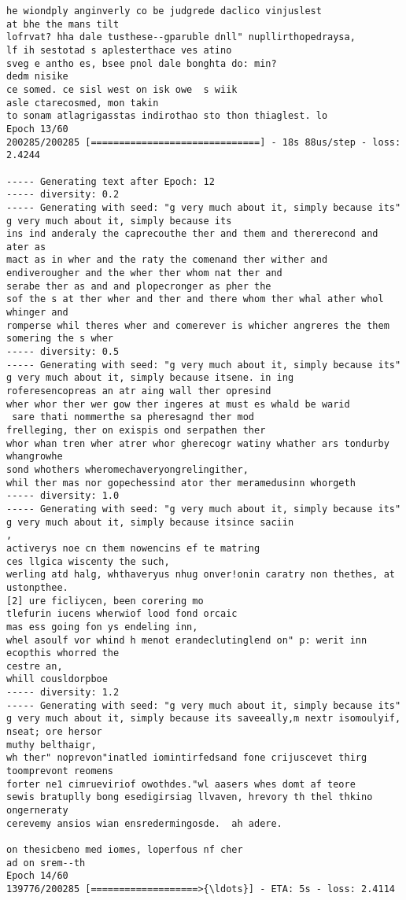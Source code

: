 \documentclass[11pt]{article}
\begin{document}
\begin{Verbatim}[commandchars=\\\{\}]
he wiondply anginverly co be judgrede daclico vinjuslest
at bhe the mans tilt
lofrvat? hha dale tusthese--gparuble dnll" nupllirthopedraysa,
lf ih sestotad s aplesterthace ves atino
sveg e antho es, bsee pnol dale bonghta do: min?
dedm nisike
ce somed. ce sisl west on isk owe  s wiik
asle ctarecosmed, mon takin
to sonam atlagrigasstas indirothao sto thon thiaglest. lo
Epoch 13/60
200285/200285 [==============================] - 18s 88us/step - loss: 2.4244

----- Generating text after Epoch: 12
----- diversity: 0.2
----- Generating with seed: "g very much about it, simply because its"
g very much about it, simply because its
ins ind anderaly the caprecouthe ther and them and thererecond and ater as
mact as in wher and the raty the comenand ther wither and
endiverougher and the wher ther whom nat ther and
serabe ther as and and plopecronger as pher the
sof the s at ther wher and ther and there whom ther whal ather whol whinger and
romperse whil theres wher and comerever is whicher angreres the them somering the s wher
----- diversity: 0.5
----- Generating with seed: "g very much about it, simply because its"
g very much about it, simply because itsene. in ing
roferesencopreas an atr aing wall ther opresind
wher whor ther wer gow ther ingeres at must es whald be warid
 sare thati nommerthe sa pheresagnd ther mod
frelleging, ther on exispis ond serpathen ther
whor whan tren wher atrer whor gherecogr watiny whather ars tondurby whangrowhe
sond whothers wheromechaveryongrelingither,
whil ther mas nor gopechessind ator ther meramedusinn whorgeth
----- diversity: 1.0
----- Generating with seed: "g very much about it, simply because its"
g very much about it, simply because itsince saciin
,
activerys noe cn them nowencins ef te matring
ces llgica wiscenty the such,
werling atd halg, whthaveryus nhug onver!onin caratry non thethes, at
ustonpthee.
[2] ure ficliycen, been corering mo
tlefurin iucens wherwiof lood fond orcaic
mas ess going fon ys endeling inn,
whel asoulf vor whind h menot erandeclutinglend on" p: werit inn ecopthis whorred the
cestre an,
whill cousldorpboe
----- diversity: 1.2
----- Generating with seed: "g very much about it, simply because its"
g very much about it, simply because its saveeally,m nextr isomoulyif, nseat; ore hersor
muthy belthaigr,
wh ther" noprevon"inatled iomintirfedsand fone crijuscevet thirg toomprevont reomens
forter ne1 cimrueviriof owothdes."wl aasers whes domt af teore
sewis bratuplly bong esedigirsiag llvaven, hrevory th thel thkino ongerneraty
cerevemy ansios wian ensredermingosde.  ah adere.

on thesicbeno med iomes, loperfous nf cher
ad on srem--th
Epoch 14/60
139776/200285 [===================>{\ldots}] - ETA: 5s - loss: 2.4114
    \end{Verbatim}
\end{document}
